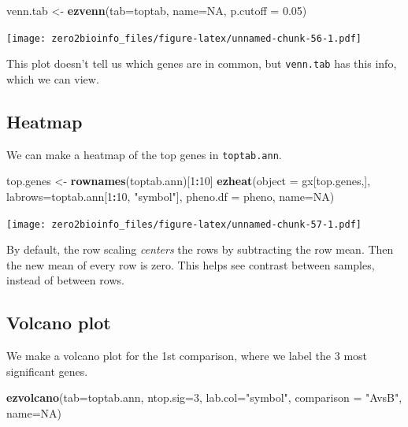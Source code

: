 \documentclass[]{article}
\newenvironment{Shaded}{\begin{snugshade}}{\end{snugshade}}
\newcommand{\KeywordTok}[1]{\textcolor[rgb]{0.13,0.29,0.53}{\textbf{#1}}}
\newcommand{\DataTypeTok}[1]{\textcolor[rgb]{0.13,0.29,0.53}{#1}}
\newcommand{\DecValTok}[1]{\textcolor[rgb]{0.00,0.00,0.81}{#1}}
\newcommand{\FloatTok}[1]{\textcolor[rgb]{0.00,0.00,0.81}{#1}}
\newcommand{\StringTok}[1]{\textcolor[rgb]{0.31,0.60,0.02}{#1}}
\newcommand{\OtherTok}[1]{\textcolor[rgb]{0.56,0.35,0.01}{#1}}
\newcommand{\OperatorTok}[1]{\textcolor[rgb]{0.81,0.36,0.00}{\textbf{#1}}}
\newcommand{\NormalTok}[1]{#1}
\begin{document}
\begin{Shaded}
\begin{Highlighting}[]
\NormalTok{venn.tab <-}\StringTok{ }\KeywordTok{ezvenn}\NormalTok{(}\DataTypeTok{tab=}\NormalTok{toptab, }\DataTypeTok{name=}\OtherTok{NA}\NormalTok{, }\DataTypeTok{p.cutoff =} \FloatTok{0.05}\NormalTok{)}
\end{Highlighting}
\end{Shaded}

\texttt{[image: zero2bioinfo\_files/figure-latex/unnamed-chunk-56-1.pdf]}

This plot doesn't tell us which genes are in common, but
\texttt{venn.tab} has this info, which we can view.

\subsection{Heatmap}\label{heatmap}

We can make a heatmap of the top genes in \texttt{toptab.ann}.

\begin{Shaded}
\begin{Highlighting}[]
\NormalTok{top.genes <-}\StringTok{ }\KeywordTok{rownames}\NormalTok{(toptab.ann)[}\DecValTok{1}\OperatorTok{:}\DecValTok{10}\NormalTok{]}
\KeywordTok{ezheat}\NormalTok{(}\DataTypeTok{object =}\NormalTok{ gx[top.genes,], }\DataTypeTok{labrows=}\NormalTok{toptab.ann[}\DecValTok{1}\OperatorTok{:}\DecValTok{10}\NormalTok{, }\StringTok{"symbol"}\NormalTok{], }\DataTypeTok{pheno.df =}\NormalTok{ pheno, }\DataTypeTok{name=}\OtherTok{NA}\NormalTok{)}
\end{Highlighting}
\end{Shaded}

\texttt{[image: zero2bioinfo\_files/figure-latex/unnamed-chunk-57-1.pdf]}

By default, the row scaling \emph{centers} the rows by subtracting the
row mean. Then the new mean of every row is zero. This helps see
contrast between samples, instead of between rows.

\subsection{Volcano plot}\label{volcano-plot}

We make a volcano plot for the 1st comparison, where we label the 3 most
significant genes.

\begin{Shaded}
\begin{Highlighting}[]
\KeywordTok{ezvolcano}\NormalTok{(}\DataTypeTok{tab=}\NormalTok{toptab.ann, }\DataTypeTok{ntop.sig=}\DecValTok{3}\NormalTok{, }\DataTypeTok{lab.col=}\StringTok{"symbol"}\NormalTok{, }\DataTypeTok{comparison =} \StringTok{"AvsB"}\NormalTok{, }\DataTypeTok{name=}\OtherTok{NA}\NormalTok{)}
\end{Highlighting}
\end{Shaded}
\end{document}
